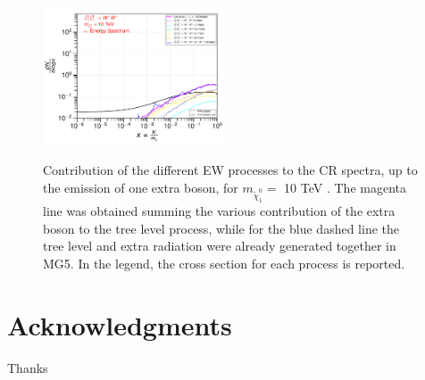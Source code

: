 \documentclass[epj,nopacs,fleqn]{svjour}
\begin{document}
\begin{figure}[!h]
	\subfigure
	{\includegraphics[width=0.48\textwidth]{Fig/n1ww_comparison/10000.0_neutrinos_tau_n1ww_comparison_10000.0.pdf} }
	
	\caption{Contribution of the different EW processes to the CR spectra, up to the emission of one extra boson, for $m_{\tilde \chi_1 ^0}=$ 10 TeV . The magenta line was obtained summing the various contribution of the extra boson to the tree level process, while for the blue dashed line the tree level and extra radiation were already generated together in MG5. In the legend, the cross section for each process is reported.}
	\label{ew_comparison_0}
\end{figure}





\clearpage
\section*{Acknowledgments}
Thanks
%


\end{document}
